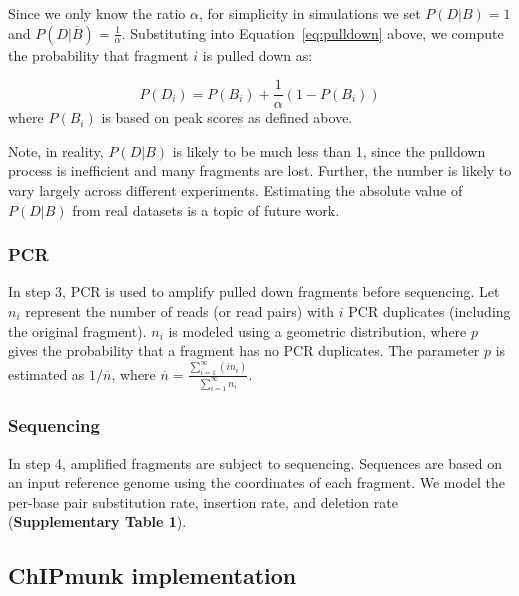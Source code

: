 \documentclass[12pt]{article}
\begin{document}
Since we only know the ratio $\alpha$, for simplicity in simulations we set $P(D|B)=1$ and $P(D|\overline{B})=\frac{1}{\alpha}$.
Substituting into Equation~\ref{eq:pulldown} above, we compute the probability that fragment $i$ is pulled down as:

\begin{equation}
  P(D_i) = P(B_i) + \frac{1}{\alpha}(1-P(B_i))
\end{equation}
where $P(B_i)$ is based on peak scores as defined above.

Note, in reality, $P(D|B)$ is likely to be much less than 1, since the pulldown process is inefficient and many fragments are lost.
Further, the number is likely to vary largely across different experiments.
Estimating the absolute value of $P(D|B)$ from real datasets is a topic of future work.

\subsubsection*{PCR}

In step 3, PCR is used to amplify pulled down fragments before sequencing.
Let $n_i$ represent the number of reads (or read pairs) with $i$ PCR duplicates (including the original fragment).
$n_i$ is modeled using a geometric distribution, where $p$ gives the probability that a fragment has no PCR duplicates.
The parameter $p$ is estimated as $1/\overline{n}$, where $\overline{n} = \frac{\sum_{i=1}^\infty (i  n_i)}{\sum_{i=1}^\infty n_i}$.

\subsubsection*{Sequencing}

In step 4, amplified fragments are subject to sequencing.
Sequences are based on an input reference genome using the coordinates of each fragment.
We model the per-base pair substitution rate, insertion rate, and deletion rate (\textbf{Supplementary Table 1}).

\subsection*{ChIPmunk implementation}
\end{document}
